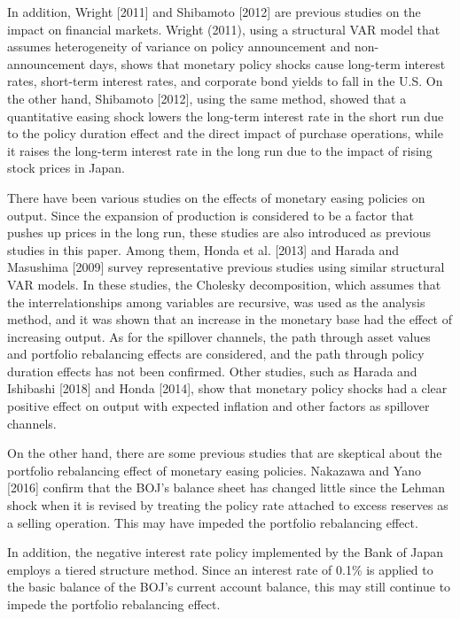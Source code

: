 \documentclass[12pt]{article}
\begin{document}
In addition, Wright [2011] and Shibamoto [2012] are previous studies on the impact on financial markets.
Wright (2011), using a structural VAR model that assumes heterogeneity of variance on policy announcement and non-announcement days, shows that monetary policy shocks cause long-term interest rates, short-term interest rates, and corporate bond yields to fall in the U.S.
On the other hand, Shibamoto [2012], using the same method, showed that a quantitative easing shock lowers the long-term interest rate in the short run due to the policy duration effect and the direct impact of purchase operations, while it raises the long-term interest rate in the long run due to the impact of rising stock prices in Japan.

There have been various studies on the effects of monetary easing policies on output.
Since the expansion of production is considered to be a factor that pushes up prices in the long run, these studies are also introduced as previous studies in this paper.
Among them, Honda et al. [2013] and Harada and Masushima [2009] survey representative previous studies using similar structural VAR models.
In these studies, the Cholesky decomposition, which assumes that the interrelationships among variables are recursive, was used as the analysis method, and it was shown that an increase in the monetary base had the effect of increasing output.
As for the spillover channels, the path through asset values and portfolio rebalancing effects are considered, and the path through policy duration effects has not been confirmed.
Other studies, such as Harada and Ishibashi [2018] and Honda [2014], show that monetary policy shocks had a clear positive effect on output with expected inflation and other factors as spillover channels.

On the other hand, there are some previous studies that are skeptical about the portfolio rebalancing effect of monetary easing policies.
Nakazawa and Yano [2016] confirm that the BOJ's balance sheet has changed little since the Lehman shock when it is revised by treating the policy rate attached to excess reserves as a selling operation.
This may have impeded the portfolio rebalancing effect.

In addition, the negative interest rate policy implemented by the Bank of Japan employs a tiered structure method.
Since an interest rate of 0.1\% is applied to the basic balance of the BOJ's current account balance, this may still continue to impede the portfolio rebalancing effect.
\end{document}
